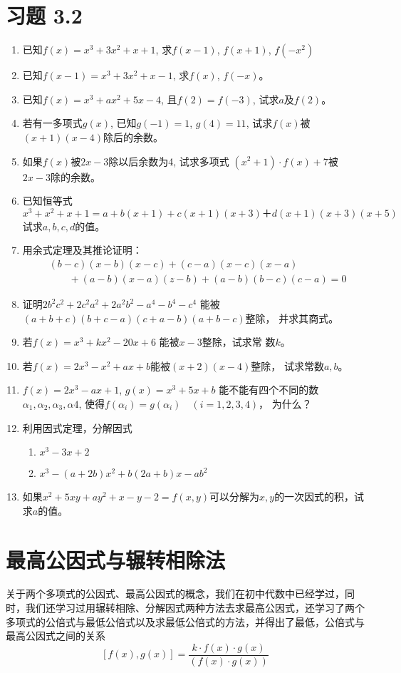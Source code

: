 \section*{习题 3.2}
\begin{enumerate}
    \item 
已知$f(x)=x^3+3x^2+x+1$, 求$f(x-1)$, $f(x+1)$, $f (-x^2)$
\item 已知$f(x-1)=x^3+3x^2+x-1$, 求$f(x)$, $f(-x)$。
\item 已知$f(x)=x^3+ax^2+5x-4$, 且$f(2)=f(-3)$, 试求$a$及$f(2)$。
\item 若有一多项式$g(x)$, 已知$g(-1)=1$, $g(4)=11$, 试求$f(x)$被$(x+1)(x-4)$除后的余数。

\item 如果$f(x)$被$2x-3$除以后余数为4, 试求多项式
$(x^2+1)\cdot f(x)+7$被$2x-3$除的余数。
\item 已知恒等式
\[x^3+x^2+x+1=a+b (x+1) +c (x+1) (x+3)＋d (x+1) (x+3)(x+5)\]
试求$a,b,c,d$的值。
\item 用余式定理及其推论证明：
\[\begin{split}
   & (b-c) (x-b)(x-c)+(c-a)(x-c)(x-a)\\
&\qquad + (a-b) (x-a)(z-b)+(a-b)(b - c)(c-a)=0
\end{split}\]
\item 证明$2b^2c^2+2c^2a^2+2a^2b^2-a^4-b^4-c^4$ 能被$(a+b+c)(b+c-a)(c+a-b)(a+b-c)$整除，
并求其商式。
\item 若$f(x)=x^3+kx^2-20x+6$ 能被$x-3$整除，试求常
数$k$。
\item 若$f(x)=2x^3-x^2+ax+b$能被$(x+2)(x-4)$整除，
试求常数$a,b$。
\item $f(x)=2x^3-ax+1$, $g(x)=x^3+5x+b$ 能不能有四个不同的数$\alpha_1,\alpha_2,\alpha_3,\alpha4$, 使得$f (\alpha_i) =g (\alpha_i)\quad  (i=1,2,3,4)$，
为什么？
\item 利用因式定理，分解因式
\begin{enumerate}
    \item $x^3-3x+2$
    \item $x^3-(a+2b)x^2+b(2a+b)x-ab^2$
\end{enumerate}

\item 如果$x^2+5xy+ay^2+x-y-2=f(x,y)$可以分解为$x,y$的一次因式的积，试求$a$的值。
\end{enumerate}

\section{最高公因式与辗转相除法}
关于两个多项式的公因式、最高公因式的概念，我们在初中代数中已经学过，同时，我们还学习过用辗转相除、分解因式两种方法去求最高公因式，还学习了两个多项式的公倍式与最低公倍式以及求最低公倍式的方法，并得出了最低，公倍式与最高公因式之间的关系
\[[f(x),g(x)]=\frac{k\cdot f(x)\cdot g(x)}{(f(x)\cdot g(x))}\]

